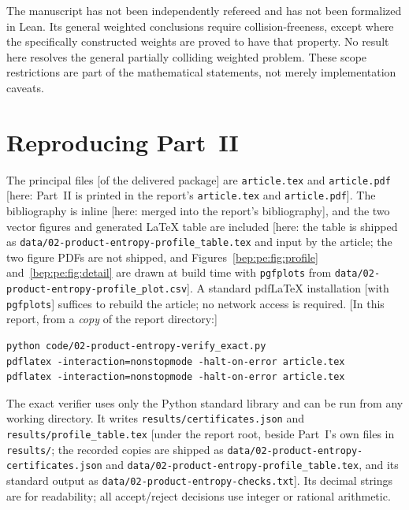 \documentclass[11pt]{article}
\numberwithin{equation}{section}
\theoremstyle{definition}
\theoremstyle{remark}
\begin{document}
The manuscript has not been independently refereed and has not been
formalized in Lean. Its general weighted conclusions require
collision-freeness, except where the specifically constructed weights
are proved to have that property. No result here resolves the general
partially colliding weighted problem. These scope restrictions are
part of the mathematical statements, not merely implementation caveats.


\section{Reproducing Part~II}\label{bep:pe:sec:reproduce}

The principal files [of the delivered package] are \texttt{article.tex}
and \texttt{article.pdf} [here: Part~II is printed in the report's
\nolinkurl{article.tex} and \nolinkurl{article.pdf}]. The bibliography is
inline [here: merged into the report's bibliography], and the two vector
figures and generated LaTeX table are included [here: the table is
shipped as \nolinkurl{data/02-product-entropy-profile_table.tex} and input
by the article; the two figure PDFs are not shipped, and
Figures~\ref{bep:pe:fig:profile} and~\ref{bep:pe:fig:detail} are drawn at
build time with \texttt{pgfplots} from
\nolinkurl{data/02-product-entropy-profile_plot.csv}]. A standard
pdfLaTeX installation [with \texttt{pgfplots}] suffices to rebuild the
article; no network access is required. [In this report, from a
\emph{copy} of the report directory:]
\begin{verbatim}
python code/02-product-entropy-verify_exact.py
pdflatex -interaction=nonstopmode -halt-on-error article.tex
pdflatex -interaction=nonstopmode -halt-on-error article.tex
\end{verbatim}
\begin{sloppypar}
The exact verifier uses only the Python standard library and can be run
from any working directory. It writes \texttt{results/certificates.json}
and \texttt{results/profile\_table.tex} [under the report root, beside
Part~I's own files in \nolinkurl{results/}; the recorded copies are
shipped as \nolinkurl{data/02-product-entropy-certificates.json} and
\nolinkurl{data/02-product-entropy-profile_table.tex}, and its standard
output as \nolinkurl{data/02-product-entropy-checks.txt}]. Its decimal
strings are for readability; all accept/reject decisions use integer or
rational arithmetic.
\end{sloppypar}
\end{document}
